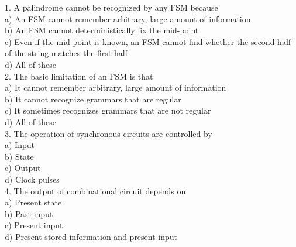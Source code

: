 \documentclass{article}
\begin{document}
\begin{multicols}{2}
1. A palindrome cannot be recognized by any
FSM because\\
\hspace*{0.4cm} a) An FSM cannot remember arbitrary,
large amount of information\\
\hspace*{0.4cm} b) An FSM cannot deterministically fix
the mid-point\\
\hspace*{0.4cm} c) Even if the mid-point is known, an
FSM cannot find whether the second
half of the string matches the first half\\
\hspace*{0.4cm} d) All of these\\

\vspace*{0.3cm}
2. The basic limitation of an FSM is that\\
\hspace*{0.4cm} a) It cannot remember arbitrary, large
amount of information\\
\hspace*{0.4cm} b) It cannot recognize grammars that are
regular\\
\hspace*{0.4cm} c) It sometimes recognizes grammars that
are not regular\\
\hspace*{0.4cm} d) All of these\\

\vspace*{0.3cm}
3. The operation of synchronous circuits are
controlled by\\
\hspace*{0.4cm} a) Input\\
\hspace*{0.4cm} b) State\\
\hspace*{0.4cm} c) Output\\
\hspace*{0.4cm} d) Clock pulses\\

\vspace*{0.3cm}
4. The output of combinational circuit depends
on\\
\hspace*{0.4cm} a) Present state\\
\hspace*{0.4cm} b) Past input\\
\hspace*{0.4cm} c) Present input\\
\hspace*{0.4cm} d) Present stored information and present
input\\


\end{multicols}
\end{document}

